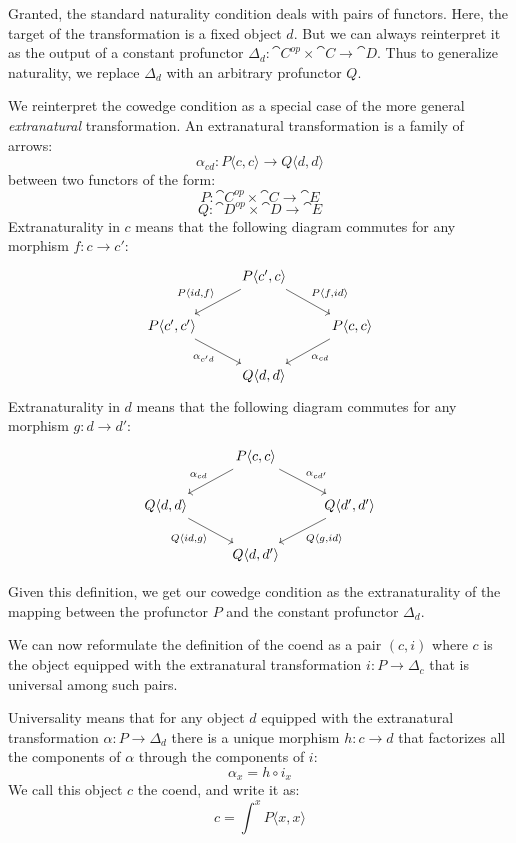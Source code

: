 \documentclass[DaoFP]{subfiles}
\begin{document}
Granted, the standard naturality condition deals with pairs of functors. Here, the target of the transformation is a fixed object $d$. But we can always reinterpret it as the output of a constant profunctor $\Delta_d \colon \cat C^{op} \times \cat C \to \cat D$. Thus to generalize naturality, we replace $\Delta_d$ with an arbitrary profunctor $Q$.

We reinterpret the cowedge condition as a special case of the more general \emph{extranatural} transformation. An extranatural transformation is a family of arrows:
\[ \alpha_{c d} \colon P \langle c, c \rangle \to Q \langle d, d \rangle \]
between two functors of the form:
\[ P \colon \cat C^{op} \times \cat C \to \cat E \]
\[ Q \colon \cat D^{op} \times \cat D \to \cat E \]
Extranaturality in $c$ means that the following diagram commutes for any morphism $f \colon c \to c'$:
\[
 \begin{tikzcd}
 &P \langle c', c \rangle
 \arrow[ld, "{P \langle id, f \rangle}"']
 \arrow[rd, "{P \langle f, id \rangle}"]
 \\
      P \langle c', c' \rangle
 \arrow[dr, "\alpha_{c' d}"']
 &&P \langle c, c \rangle
 \arrow[dl, "\alpha_{c d}"]
 \\
 & Q \langle d, d \rangle
 \end{tikzcd}
\]
Extranaturality in $d$ means that the following diagram commutes for any morphism $g \colon d \to d'$:
\[
 \begin{tikzcd}
 &P \langle c, c \rangle
 \arrow[ld, "\alpha_{c d}"']
 \arrow[rd, "\alpha_{c d'}"]
 \\
      Q \langle d, d \rangle
 \arrow[dr, "{Q \langle id, g\rangle}"']
 &&Q \langle d', d' \rangle
 \arrow[dl, "{Q \langle g,  id\rangle}"]
 \\
 & Q \langle d, d' \rangle
 \end{tikzcd}
\]

Given this definition, we get our cowedge condition as the extranaturality of the mapping between the profunctor $P$ and the constant profunctor $\Delta_d$. 

We can now reformulate the definition of the coend as a pair $(c, i)$ where $c$ is the object equipped with the extranatural transformation  $i \colon P \to \Delta_c$ that is universal among such pairs.

Universality means that for any object $d$ equipped with the extranatural transformation $\alpha \colon P \to \Delta_d$ there is a unique morphism $h \colon c \to d$ that factorizes all the components of $\alpha$ through the components of $i$:
\[ \alpha_x = h \circ i_x \]
We call this object $c$ the coend, and write it as:
\[ c = \int^x P\langle x, x \rangle \]
\end{document}
